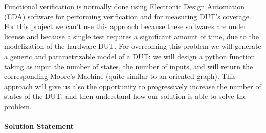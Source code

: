 \documentclass{article}
\begin{document}

Functional verification is normally done using Electronic Design Automation (EDA) software for performing verification and for measuring DUT's coverage. For this project we can't use this approach because these softwares are under license and because a single test requires a significant amount of time, due to the modelization of the hardware DUT. For overcoming this problem we will generate a generic and parametrizable model of a DUT: we will design a python function taking as input the number of states, the number of inputs, and will return the corresponding Moore's Machine (quite similar to an oriented graph). This approach will give us also the opportunity to progressively increase the number of states of the DUT, and then understand how our solution is able to solve the problem.

\paragraph{Solution Statement}

\end{document}
